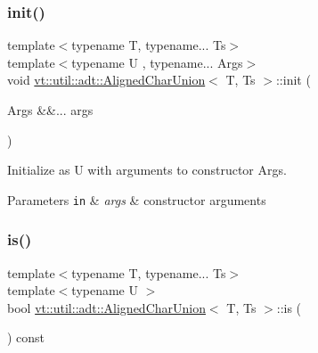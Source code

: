 \mbox{\label{structvt_1_1util_1_1adt_1_1_aligned_char_union_a50f97a051cd59537528d6b5879f88a53}} 
\subsubsection{\texorpdfstring{init()}{init()}}
{\footnotesize\ttfamily template$<$typename T, typename... Ts$>$ \\
template$<$typename U , typename... Args$>$ \\
void \hyperlink{structvt_1_1util_1_1adt_1_1_aligned_char_union}{vt\+::util\+::adt\+::\+Aligned\+Char\+Union}$<$ T, Ts $>$\+::init (\begin{DoxyParamCaption}\item[{Args \&\&...}]{args }\end{DoxyParamCaption})\hspace{0.3cm}{\ttfamily [inline]}}



Initialize as {\ttfamily U} with arguments to constructor {\ttfamily Args}. 


\begin{DoxyParams}[1]{Parameters}
\mbox{\tt in}  & {\em args} & constructor arguments \\
\hline
\end{DoxyParams}
\mbox{\label{structvt_1_1util_1_1adt_1_1_aligned_char_union_af78cf3c2f5b904d1f49ee19f0ac7871f}} 
\subsubsection{\texorpdfstring{is()}{is()}}
{\footnotesize\ttfamily template$<$typename T, typename... Ts$>$ \\
template$<$typename U $>$ \\
bool \hyperlink{structvt_1_1util_1_1adt_1_1_aligned_char_union}{vt\+::util\+::adt\+::\+Aligned\+Char\+Union}$<$ T, Ts $>$\+::is (\begin{DoxyParamCaption}{ }\end{DoxyParamCaption}) const\hspace{0.3cm}{\ttfamily [inline]}}



